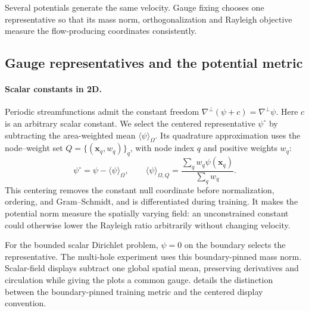 \begingroup
Several potentials generate the same velocity. Gauge fixing chooses one representative so that its mass norm, orthogonalization and Rayleigh objective measure the flow-producing coordinates consistently.
\par\endgroup

\subsection{Gauge representatives and the potential metric}
\label{sec:gauge}
\paragraph{Scalar constants in 2D.}
{Periodic streamfunctions admit the constant freedom $\nabla^\perp(\psi+c)=\nabla^\perp\psi$. Here $c$ is an arbitrary scalar constant. We select the centered representative $\psi^\circ$ by subtracting the area-weighted mean $\langle\psi\rangle_\Omega$. Its quadrature approximation uses the node--weight set $Q=\{(\mathbf x_q,w_q)\}_q$, with node index $q$ and positive weights $w_q$:}
\begin{equation}
\psi^\circ=\psi-\langle\psi\rangle_\Omega,
\qquad \langle\psi\rangle_{\Omega,Q}=\frac{\sum_q w_q\psi(\mathbf x_q)}{\sum_q w_q}.
\label{eq:scalar-gauge}
\end{equation}
{This centering removes the constant null coordinate before normalization, ordering, and Gram--Schmidt, and is differentiated during training. It makes the potential norm measure the spatially varying field: an unconstrained constant could otherwise lower the Rayleigh ratio arbitrarily without changing velocity.}


For the bounded scalar Dirichlet problem, $\psi=0$ on the boundary selects the representative. The multi-hole experiment uses this boundary-pinned mass norm. Scalar-field displays subtract one global spatial mean, preserving derivatives and circulation while giving the plots a common gauge.  details the distinction between the boundary-pinned training metric and the centered display convention.

